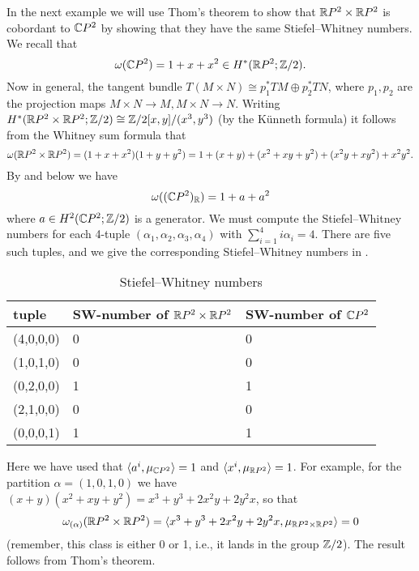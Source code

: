 \documentclass[ma3408.tex]{subfiles}
\begin{document}
\begin{Exa}
In the next example we will use Thom's theorem to show that $\mathbb{R} P^2 \times \mathbb{R} P^2$ is cobordant to $\mathbb{C} P^2$ by showing that they have the same Stiefel--Whitney numbers. We recall that 
\[
\omega(\mathbb{C} P^2) = 1+x + x^2 \in H^*(\mathbb{R} P^2;\mathbb{Z}/2). 
\]
Now in general, the tangent bundle $T(M \times N) \cong p_1^*TM \oplus p_2^*TN$, where $p_1,p_2$ are the projection maps $M \times N \to M,M \times N \to N$. Writing $H^*(\mathbb{R} P^2 \times \mathbb{R} P^2;\mathbb{Z}/2) \cong \mathbb{Z}/2[x,y]/(x^3,y^3)$ (by the K\"{u}nneth formula) it follows from the Whitney sum formula that 
\[
\omega(\mathbb{R} P^2 \times \mathbb{R} P^2) = (1+x+x^2)(1+y+y^2) = 1 + (x+y) +(x^2+xy+y^2) + (x^2y+xy^2)+ x^2y^2.
\]
By  and  below we have
\[
\omega((\mathbb{C} P^2)_{\mathbb{R}}) = 1 + a+ a^2
\]
where $a \in H^2(\mathbb{C} P^2;\mathbb{Z}/2)$ is a generator. We must compute the Stiefel--Whitney numbers for each 4-tuple $(\alpha_1,\alpha_2,\alpha_3,\alpha_4)$ with $\sum_{i=1}^4i\alpha_i = 4$. There are five such tuples, and we give the corresponding Stiefel--Whitney numbers in .
\begin{table}[]
\caption{Stiefel--Whitney numbers}
\begin{tabular}{@{}lll@{}}
\toprule
tuple     & SW-number of $\mathbb{R} P^2 \times \mathbb{R} P^2$ & SW-number of $\mathbb{C} P^2$ \\ \midrule
(4,0,0,0) & 0                                       & 0                       \\
(1,0,1,0) & 0                                       & 0                       \\
(0,2,0,0) & 1                                       & 1                       \\
(2,1,0,0) & 0                                       & 0                       \\
(0,0,0,1) & 1                                       & 1                       \\ \bottomrule
\end{tabular}
\label{Tab:Tcr}
\end{table}
Here we have used that $\langle a^i,\mu_{\mathbb{C} P^2} \rangle = 1$ and $\langle x^i,\mu_{\mathbb{R} P^2} \rangle = 1$. For example, for the partition $\alpha = (1,0,1,0)$ we have $(x+y)(x^2+xy+y^2) = x^3 + y^3 +2x^2y +2 y^2x$, so that 
\[
\omega_{(\alpha)}(\mathbb{R} P^2 \times \mathbb{R} P^2) = \langle x^3+y^3+2x^2y+2y^2x,\mu_{\mathbb{R} P^2 \times \mathbb{R} P^2} \rangle = 0
\]
(remember, this class is either 0 or 1, i.e., it lands in the group $\mathbb{Z}/2$). The result follows from Thom's theorem.
\end{Exa}
\end{document}
